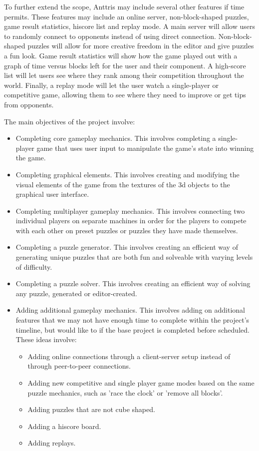 \documentclass[12pt]{article}
\begin{document}
To further extend the scope, Anttris may include several other features if time permits. These features may include an online server, non-block-shaped puzzles, game result statistics, hiscore list and replay mode. A main server will allow users to randomly connect to opponents instead of using direct connection. Non-block-shaped puzzles will allow for more creative freedom in the editor and give puzzles a fun look. Game result statistics will show how the game played out with a graph of time versus blocks left for the user and their component. A high-score list will let users see where they rank among their competition throughout the world. Finally, a replay mode will let the user watch a single-player or competitive game, allowing them to see where they need to improve or get tips from opponents.

The main objectives of the project involve:
\begin{itemize}
 \item Completing core gameplay mechanics. This involves completing a single-player game that uses user input to manipulate the game's state into winning the game.
 \item Completing graphical elements. This involves creating and modifying the visual elements of the game from the textures of the 3d objects to the graphical user interface.
 \item Completing multiplayer gameplay mechanics. This involves connecting two individual players on separate machines in order for the players to compete with each other on preset puzzles or puzzles they have made themselves.
 \item Completing a puzzle generator. This involves creating an efficient way of generating unique puzzles that are both fun and solveable with varying levels of difficulty.
 \item Completing a puzzle solver. This involves creating an efficient way of solving any puzzle, generated or editor-created.
 \item Adding additional gameplay mechanics. This involves adding on additional features that we may not have enough time to complete within the project's timeline, but would like to if the base project is completed before scheduled. These ideas involve:
  \begin{itemize}
  \item Adding online connections through a client-server setup instead of through peer-to-peer connections.
  \item Adding new competitive and single player game modes based on the same puzzle mechanics, such as 'race the clock' or 'remove all blocks'.
  \item Adding puzzles that are not cube shaped.
  \item Adding a hiscore board.
  \item Adding replays.
  \end{itemize}
\end{itemize}
\end{document}
